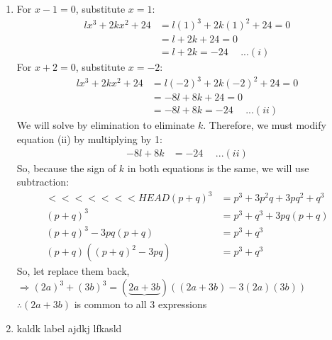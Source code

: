\begin{multicols}{2}
\begin{enumerate}[label={\textbf{\arabic*.}}]
    
   \item For \( x - 1 = 0 \), substitute \( x = 1 \):
        \begin{align*}
            lx^3 + 2kx^2 + 24 &= l(1)^3 + 2k(1)^2 + 24 = 0 \\
            &= l + 2k + 24 = 0 \\ 
            &= l + 2k = -24 \hspace{15pt}...(i)
        \end{align*}
        For \( x + 2 = 0 \), substitute \( x = -2 \):
        \begin{align*}
            lx^3 + 2kx^2 + 24 &= l(-2)^3 + 2k(-2)^2 + 24 = 0 \\
            &= -8l + 8k + 24 = 0 \\ 
            &= -8l + 8k = -24 \hspace{15pt}...(ii)
        \end{align*}
        We will solve by elimination to eliminate \( k \). Therefore, we must modify equation (ii) by multiplying by 1:
        \begin{align*}
            -8l + 8k &= -24 \hspace{15pt}...(ii)
        \end{align*}
        So, because the sign of \( k \) in both equations is the same, we will use subtraction:
        \begin{align*} 
<<<<<<< HEAD
            (p + q)^3 &= p^3 + 3p^2q + 3pq^2 + q^3 \\
            (p + q)^3 &= p^3 + q^3 + 3pq(p + q)  \\
            (p + q)^3 - 3pq(p + q) & = p^3 + q^3 \\
            (p+q)((p+q)^2 - 3pq) &= p^3 + q^3
        \end{align*}
        So, let replace them back, \\
        $ \Rightarrow (2a)^3 + (3b)^3 =(\underbrace{2a + 3b})\left((2a + 3b) - 3(2a)(3b)\right) $ \\
        $\therefore (2a + 3b)$ is common to all 3 expressions
    \item kaldk label
    ajdkj lfkasld 


\end{enumerate}
\end{multicols}
